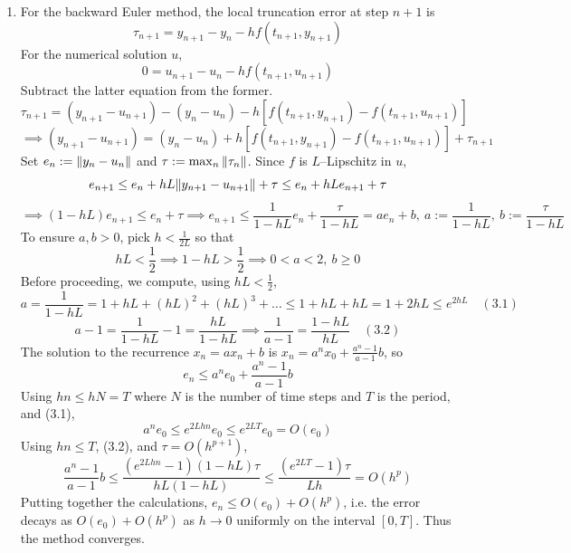 \documentclass{article}
\newcommand{\imp}{\implies}
\begin{document}
\begin{enumerate}
\item For the backward Euler method, the local truncation error at step $n+1$ is
$$\tau_{n+1} = y_{n+1} - y_n - hf(t_{n+1},y_{n+1})$$
For the numerical solution $u$,
$$0 = u_{n+1} - u_n - hf(t_{n+1},u_{n+1})$$
Subtract the latter equation from the former.
$$\tau_{n+1} = (y_{n+1}-u_{n+1}) - (y_n-u_n) - h[f(t_{n+1},y_{n+1})-f(t_{n+1},u_{n+1})]$$
$$\imp (y_{n+1}-u_{n+1}) = (y_n-u_n) + h[f(t_{n+1},y_{n+1})-f(t_{n+1},u_{n+1})] + \tau_{n+1}$$
Set $e_n:=\norm{y_n-u_n}$ and $\tau:=\max_n\norm{\tau_n}$. Since $f$ is $L$--Lipschitz in $u$,
$$e_{n+1} \le e_n + hL\norm{y_{n+1}-u_{n+1}} + \tau \le e_n + hLe_{n+1} + \tau$$
$$\imp (1-hL)e_{n+1} \le e_n + \tau
\imp e_{n+1} \le \frac{1}{1-hL}e_n + \frac{\tau}{1-hL} = ae_n + b,~a:=\frac{1}{1-hL},~b:=\frac{\tau}{1-hL}$$
To ensure $a,b>0$, pick $h<\frac{1}{2L}$ so that
$$hL < \frac12 \imp 1-hL > \frac12 \imp 0 < a < 2,~b\ge0$$
Before proceeding, we compute, using $hL<\frac12$,
$$a = \frac{1}{1-hL} = 1 + hL + (hL)^2 + (hL)^3 + \dots \le 1 + hL + hL = 1 + 2hL \le e^{2hL} \quad (3.1)$$
$$a - 1 = \frac{1}{1-hL} - 1 = \frac{hL}{1-hL} \imp \frac{1}{a-1} = \frac{1-hL}{hL} \quad (3.2)$$
The solution to the recurrence $x_n=ax_n+b$ is $x_n=a^nx_0+\frac{a^n-1}{a-1}b$, so
$$e_n \le a^ne_0 + \frac{a^n-1}{a-1}b$$
Using $hn\le hN=T$ where $N$ is the number of time steps and $T$ is the period, and (3.1),
$$a^ne_0 \le e^{2Lhn}e_0 \le e^{2LT}e_0 = O(e_0)$$
Using $hn\le T$, (3.2), and $\tau=O(h^{p+1})$,
$$\frac{a^n-1}{a-1}b \le \frac{(e^{2Lhn}-1)(1-hL)\tau}{hL(1-hL)} \le \frac{(e^{2LT}-1)\tau}{Lh} = O(h^p)$$
Putting together the calculations, $e_n\le O(e_0)+O(h^p)$, i.e. the error decays as $O(e_0)+O(h^p)$ as $h\to0$ uniformly on the interval $[0,T]$. Thus the method converges.



\end{enumerate}
\end{document}
